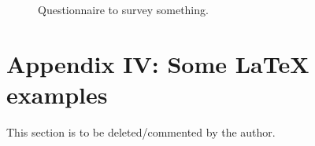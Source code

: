 	\begin{figure}[H]
		\centering
		\caption[Questionnaire]{Questionnaire to survey something.}%
	\end{figure}

\clearpage  %
\section*{Appendix IV: Some \LaTeX{} examples}

This section is to be deleted/commented by the author.
